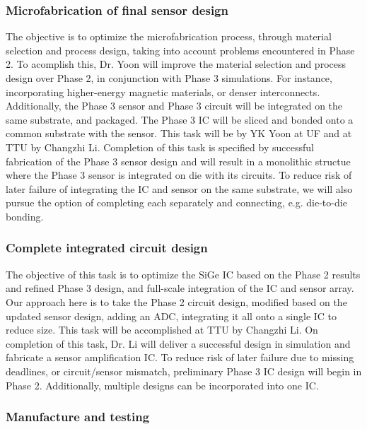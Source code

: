 \subsubsection{Microfabrication of final sensor design}\label{sec:p3:mf}

The objective is to optimize the microfabrication process, through material selection and process design, taking into account problems encountered in Phase 2. To acomplish this, Dr. Yoon will improve the material selection and process design over Phase 2, in conjunction with Phase 3 simulations. For instance, incorporating higher-energy magnetic materials, or denser interconnects. Additionally, the Phase 3 sensor and Phase 3 circuit will be integrated on the same substrate, and packaged. The Phase 3 IC will be sliced and bonded onto a common substrate with the sensor.  This task will be by YK Yoon at UF and at TTU by Changzhi Li. Completion of this task is specified by successful fabrication of the Phase 3 sensor design and will result in a monolithic structue where the Phase 3 sensor is integrated on die with its circuits. To reduce risk of later failure of integrating the IC and sensor on the same substrate, we will also pursue the option of completing each separately and connecting, e.g. die-to-die bonding.

\subsubsection{Complete integrated circuit design}\label{sec:p3:cir}

The objective of this task is to optimize the SiGe IC based on the Phase 2 results and refined Phase 3 design, and full-scale integration of the IC and sensor array. Our approach here is to take the Phase 2 circuit design, modified based on the updated sensor design, adding an ADC, integrating it all onto a single IC to reduce size. This task will be accomplished at TTU by Changzhi Li. On completion of this task, Dr. Li will deliver a successful design in simulation and fabricate a sensor amplification IC. To reduce risk of later failure due to missing deadlines, or circuit/sensor mismatch, preliminary Phase 3 IC design will begin in Phase 2. Additionally, multiple designs can be incorporated into one IC.

\subsubsection{Manufacture and testing}\label{sec:p3:test}

